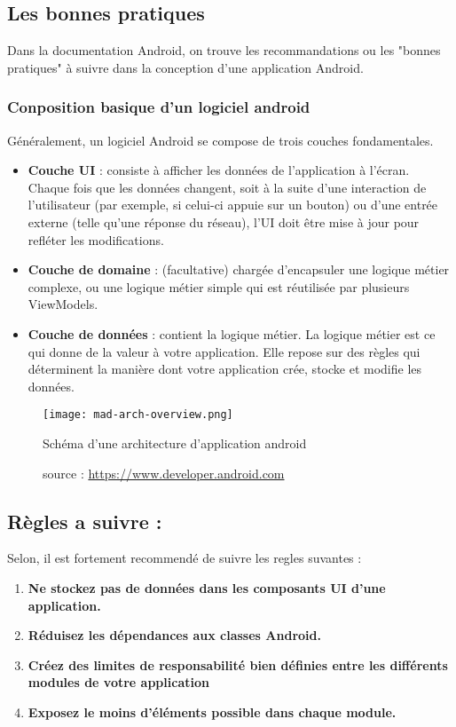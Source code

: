 \subsection{Les bonnes pratiques}
Dans la documentation Android, on trouve les recommandations ou les "bonnes pratiques" à suivre dans la conception d'une application Android.
\subsubsection{Conposition basique d'un logiciel android}
Généralement, un logiciel Android se compose de trois couches fondamentales.
\begin{itemize}
    \item \textbf{Couche UI} : consiste à afficher les données de l'application à l'écran. Chaque fois que les données changent, soit à la suite d'une interaction de l'utilisateur (par exemple, si celui-ci appuie sur un bouton) ou d'une entrée externe (telle qu'une réponse du réseau), l'UI doit être mise à jour pour refléter les modifications.
    \item \textbf{Couche de domaine} : (facultative) chargée d'encapsuler une logique métier complexe, ou une logique métier simple qui est réutilisée par plusieurs ViewModels.
    \item \textbf{Couche de données} : contient la logique métier. La logique métier est ce qui donne de la valeur à votre application. Elle repose sur des règles qui déterminent la manière dont votre application crée, stocke et modifie les données.
\end{itemize}
\begin{center}
    \begin{figure}[h]
        \centering
        \texttt{[image: mad-arch-overview.png]}
        \caption{Schéma d'une architecture d'application android} \label{android app schemas}
        \caption*{\small{source : \url{https://www.developer.android.com}}}
    \end{figure}
\end{center}
\subsection{Règles a suivre :}
Selon\cite{androidGuideLarchitecture}, il est fortement recommendé de suivre les regles suvantes :
\begin{enumerate}
    \item \textbf{Ne stockez pas de données dans les composants UI d'une application.}
    \item \textbf{Réduisez les dépendances aux classes Android.}
    \item \textbf{Créez des limites de responsabilité bien définies entre les différents modules de votre application}
    \item \textbf{Exposez le moins d'éléments possible dans chaque module.}
\end{enumerate}


